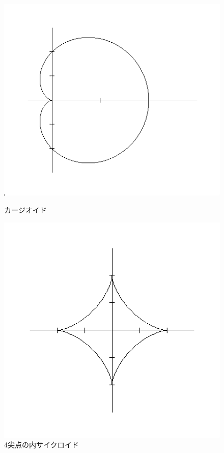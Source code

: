 \documentclass{jsarticle}
\begin{document}
        \begin{figure}[h]
            \begin{minipage}{0.5\hsize}
                \centering
                \includegraphics[width=1\hsize]{cardioid.png}
                \caption{カージオイド}
                \label{fig:cardioid}
            \end{minipage}
            \begin{minipage}{0.5\hsize}
                \centering
                \includegraphics[width=1\hsize]{hypocycloid.png}
                \caption{4尖点の内サイクロイド}
                \label{fig:hypocycloid}
            \end{minipage}
        \end{figure}
\end{document}
